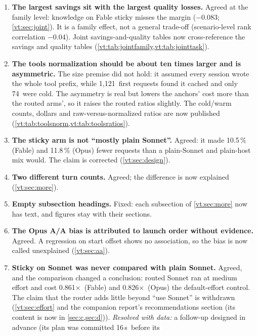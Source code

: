 \documentclass[11pt,letterpaper]{article}
\newcommand{\X}{\ensuremath{\times}}
\newcommand{\EcFirstAfter}{16\,s}
\newcommand{\QFableStickyMarginGap}{0.0035}
\newcommand{\RvColdTotal}{74}
\newcommand{\RvEffFableAll}{0.861}
\newcommand{\RvEffOpusAll}{0.826}
\newcommand{\RvKnowFableSticky}{$-$0.083}
\newcommand{\RvReqGapFable}{10.5}
\newcommand{\RvReqGapOpus}{11.8}
\newcommand{\RvSpearman}{$-$0.04}
\newcommand{\RvWarmTotal}{1{,}121}
\begin{document}
\begin{enumerate}[leftmargin=1.6em]
    and training values, notes that the \QFableStickyMarginGap\ margin comes from the unfiltered quality test and is
    thin, though not a bootstrap artefact (\cref{vt:sec:confirm}). Table and figure headers now label both readings
    co-primary.
  \item \textbf{The largest savings sit with the largest quality losses.} Agreed at the family level: knowledge on
    Fable sticky misses the margin (\RvKnowFableSticky; \cref{vt:sec:joint}). It is a family effect, not a general
    trade-off (scenario-level rank correlation \RvSpearman). Joint savings-and-quality tables now cross-reference the
    savings and quality tables (\cref{vt:tab:jointfamily,vt:tab:jointtask}).
  \item \textbf{The tools normalization should be about ten times larger and is asymmetric.} The size premise did not
    hold: it assumed every session wrote the whole tool prefix, while \RvWarmTotal\ first requests found it cached and
    only \RvColdTotal\ were cold. The asymmetry is real but lowers the anchors' cost more than the routed arms', so it
    raises the routed ratios slightly. The cold/warm counts, dollars and raw-versus-normalized ratios are now
    published (\cref{vt:tab:toolsnorm,vt:tab:toolsratios}).
  \item \textbf{The sticky arm is not ``mostly plain Sonnet''.} Agreed: it made \RvReqGapFable\,\% (Fable) and
    \RvReqGapOpus\,\% (Opus) fewer requests than a plain-Sonnet and plain-host mix would. The claim is corrected
    (\cref{vt:sec:design}).
  \item \textbf{Two different turn counts.} Agreed; the difference is now explained (\cref{vt:sec:more}).
  \item \textbf{Empty subsection headings.} Fixed: each subsection of \cref{vt:sec:more} now has text, and figures stay
    with their sections.
  \item \textbf{The Opus A/A bias is attributed to launch order without evidence.} Agreed. A regression on start offset
    shows no association, so the bias is now called unexplained (\cref{vt:sec:aa}).
  \item \textbf{Sticky on Sonnet was never compared with plain Sonnet.} Agreed, and the comparison changed a
    conclusion: routed Sonnet ran at medium effort and cost \RvEffFableAll\X\ (Fable) and \RvEffOpusAll\X\ (Opus) the
    default-effort control. The claim that the router adds little beyond ``use Sonnet'' is withdrawn
    (\cref{vt:sec:effort} and the companion report's recommendations section (its content is now in \cref{sec:c,sec:d})). \emph{Resolved with data:} a follow-up designed in advance (its plan was committed \EcFirstAfter\ before its

\end{enumerate}
\end{document}
